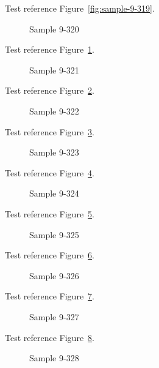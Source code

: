 Test reference Figure~\ref{fig:sample-9-319}.

\begin{figure}[tbhp]
\caption{Sample 9-320}
\label{fig:sample-9-320}
\end{figure}

Test reference Figure~\ref{fig:sample-9-320}.

\begin{figure}[tbhp]
\caption{Sample 9-321}
\label{fig:sample-9-321}
\end{figure}

Test reference Figure~\ref{fig:sample-9-321}.

\begin{figure}[tbhp]
\caption{Sample 9-322}
\label{fig:sample-9-322}
\end{figure}

Test reference Figure~\ref{fig:sample-9-322}.

\begin{figure}[tbhp]
\caption{Sample 9-323}
\label{fig:sample-9-323}
\end{figure}

Test reference Figure~\ref{fig:sample-9-323}.

\begin{figure}[tbhp]
\caption{Sample 9-324}
\label{fig:sample-9-324}
\end{figure}

Test reference Figure~\ref{fig:sample-9-324}.

\begin{figure}[tbhp]
\caption{Sample 9-325}
\label{fig:sample-9-325}
\end{figure}

Test reference Figure~\ref{fig:sample-9-325}.

\begin{figure}[tbhp]
\caption{Sample 9-326}
\label{fig:sample-9-326}
\end{figure}

Test reference Figure~\ref{fig:sample-9-326}.

\begin{figure}[tbhp]
\caption{Sample 9-327}
\label{fig:sample-9-327}
\end{figure}

Test reference Figure~\ref{fig:sample-9-327}.

\begin{figure}[tbhp]
\caption{Sample 9-328}
\label{fig:sample-9-328}
\end{figure}


